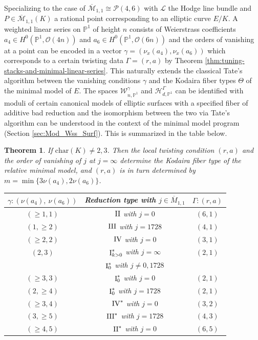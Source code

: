 \documentclass[a4paper,12pt]{amsart}
\newtheorem{thm}{Theorem}[section]
\theoremstyle{definition}
\newcommand{\bP}{\mathbb{P}}
\newcommand{\cO}{\mathcal{O}}
\newcommand{\cL}{\mathcal{L}}
\newcommand{\cW}{\mathcal{W}}
\newcommand{\cH}{\mathcal{H}}
\newcommand{\cP}{\mathcal{P}}
\newcommand{\Me}{\overline{\mathcal{M}}_{1,1}}
\newcommand{\I}{{\mathop{\rm I}}}
\newcommand{\II}{{\mathop{\rm II}}}
\newcommand{\III}{{\mathop{\rm III}}}
\newcommand{\IV}{{\mathop{\rm IV}}}
\begin{document}
	
	Specializing to the case of $\Me \cong \cP(4,6)$ with $\cL$ the Hodge line bundle and $P \in \Me(K)$ a rational point corresponding to an elliptic curve $E/K$. A weighted linear series on $\bP^1$ of height $n$ consists of Weierstrass coefficients $a_4 \in H^0(\bP^1, \cO(4n))$ and $a_6 \in H^0(\bP^1, \cO(6n))$ and the orders of vanishing at a point can be encoded in a vector $\gamma = (\nu_x(a_4), \nu_x(a_6))$ which corresponds to a certain twisting data $\Gamma = (r,a)$ by Theorem \ref{thm:tuning-stacks-and-minimal-linear-series}. This naturally extends the classical Tate's algorithm between the vanishing conditions $\gamma$ and the Kodaira fiber types $\Theta$ of the minimal model of $E$.  The spaces $\cW_{n,\bP^1}^{\gamma}$ and $\cH_{d,\bP^1}^{\Gamma}$ can be identified with moduli of certain canonical models of elliptic surfaces with a specified fiber of additive bad reduction and the isomorphism between the two via Tate's algorithm can be understood in the context of the minimal model program (Section \ref{sec:Mod_Wss_Surf}). This is summarized in the table below. 
	
	\begin{thm}\label{thm:corr_46} If $\mathrm{char}(K) \neq 2,3$. Then the local twisting condition $(r,a)$ and the order of vanishing of $j$ at $j = \infty$ determine the Kodaira fiber type of the relative minimal model, and $(r,a)$ is in turn determined by $m = \min\{3\nu(a_4), 2\nu(a_6)\}$. 
		\begin{table}[ht!]
			\label{TableOfTateCorr}
			\centering
			\begin{tabular}{|c|c|c|}
				\hline
				$\gamma : \left( \nu(a_4), ~ \nu(a_6) \right)$ & Reduction type with  $j \in \overline{M}_{1,1}$ & $\Gamma : \left( r,a \right)$ \\ \hline
				$(\ge 1,1)$ & $\II$ with $j=0$ &  $(6,1)$ \\ \hline
				$(1, \ge 2)$ & $\III$ with $j=1728$ &  $(4,1)$ \\ \hline
				$(\ge 2,2)$ & $\IV$ with $j=0$ &  $(3,1)$ \\ \hline
				$(2, 3)$ & $\I_{k > 0}^*$ with $j=\infty$ & $(2,1)$ \\
				$~$ & $\I_0^*$ with $j\neq 0, 1728$ & $~$ \\ \hline
				$(\ge 3,3)$ & $\I_0^*$ with $j=0$ &  $(2,1)$ \\ \hline
				$(2, \ge 4)$ & $\I_0^*$ with $j=1728$ &  $(2,1)$ \\ \hline
				$(\ge 3,4)$ & $\IV^*$ with $j=0$ &  $(3,2)$ \\ \hline
				$(3, \ge 5)$ & $\III^*$ with $j=1728$ &  $(4,3)$ \\ \hline
				$(\ge 4,5)$ & $\II^*$ with $j=0$ &  $(6,5)$ \\ \hline
			\end{tabular}
		\end{table}        
	\end{thm} 
	
\end{document}
